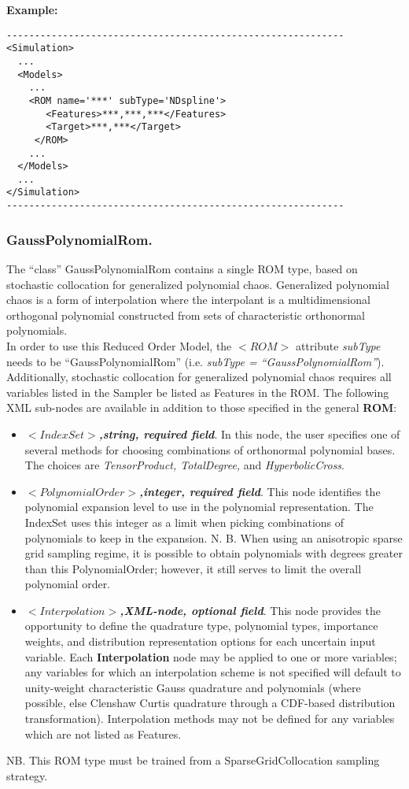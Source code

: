 \textbf{Example:}
\begin{lstlisting}[style=XML]
------------------------------------------------------------
<Simulation>
  ...
  <Models>
    ...
    <ROM name='***' subType='NDspline'>
       <Features>***,***,***</Features> 
       <Target>***,***</Target>
     </ROM>
    ...
  </Models>
  ...
</Simulation>
------------------------------------------------------------
\end{lstlisting}

\subsubsection{GaussPolynomialRom.}
\label{subsubsec:GaussPolynomialRom}
The ``class'' GaussPolynomialRom contains a single ROM type, based on stochastic collocation for generalized polynomial chaos. Generalized polynomial chaos is a form of interpolation where the interpolant is a multidimensional orthogonal polynomial constructed from sets of characteristic orthonormal polynomials. 
\\In order to use this Reduced Order Model, the $<ROM>$ attribute \textit{subType} needs to be ``GaussPolynomialRom'' (i.e. \textit{subType = ``GaussPolynomialRom''}). Additionally, stochastic collocation for generalized polynomial chaos requires all variables listed in the Sampler be listed as Features in the ROM.  The following XML sub-nodes are available in addition to those specified in the general \textbf{ROM}:
\begin{itemize}
\item $<IndexSet>$\textbf{\textit{,string, required field}}.  In this node, the user specifies one of several methods for choosing combinations of orthonormal polynomial bases.  The choices are \textit{TensorProduct, TotalDegree,} and \textit{HyperbolicCross}.
\item $<PolynomialOrder>$\textbf{\textit{,integer, required field}}. This node identifies the polynomial expansion level to use in the polynomial representation.  The IndexSet uses this integer as a limit when picking combinations of polynomials to keep in the expansion.  N. B. When using an anisotropic sparse grid sampling regime, it is possible to obtain polynomials with degrees greater than this PolynomialOrder; however, it still serves to limit the overall polynomial order.
\item $<Interpolation>$\textbf{\textit{,XML-node, optional field}}. This node provides the opportunity to define the quadrature type, polynomial types, importance weights, and distribution representation options for each uncertain input variable.  Each \textbf{Interpolation} node may be applied to one or more variables; any variables for which an interpolation scheme is not specified will default to unity-weight characteristic Gauss quadrature and polynomials (where possible, else Clenshaw Curtis quadrature through a CDF-based distribution transformation).  Interpolation methods may not be defined for any variables which are not listed as Features.
\end{itemize}
NB. This ROM type must be trained from a SparseGridCollocation sampling strategy.

